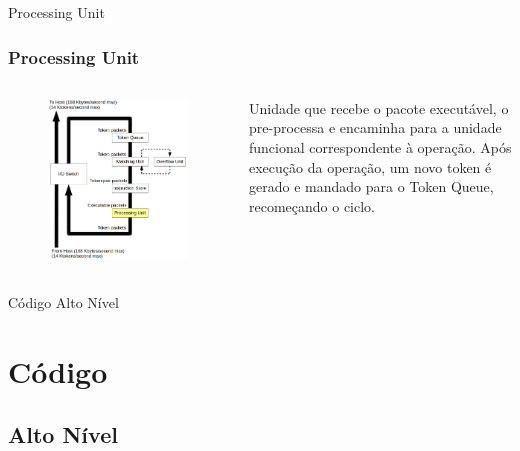 \documentclass{beamer}
\begin{document}
\begin{frame}{Processing Unit}
	\subsubsection{Processing Unit}
	\begin{columns}
		\column{6cm}
			\begin{figure}
				\centering
				\includegraphics[width=\textwidth]{ProcessingUnit}
			\end{figure}

			Unidade que recebe o pacote executável, o pre-processa e encaminha para a unidade funcional correspondente à operação. Após execução da operação, um novo token é gerado e mandado para o Token Queue, recomeçando o ciclo.
	\end{columns}
\end{frame}


\begin{frame}{Código Alto Nível}
	\section{Código}
	\subsection{Alto Nível}
	
\end{frame}
\end{document}
